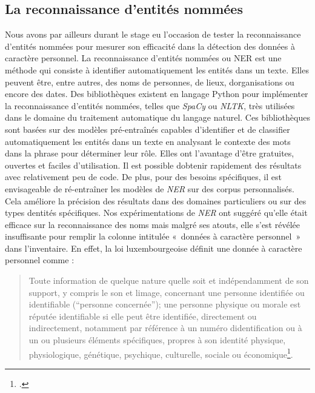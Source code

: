 \subsection{La reconnaissance d'entités nommées}

	Nous avons par ailleurs durant le stage eu l'occasion de tester la
reconnaissance d'entités nommées pour mesurer son efficacité dans la
détection des données à caractère personnel. La reconnaissance d'entités
nommées ou \gls{NER} est une méthode qui
consiste à identifier automatiquement les entités dans un texte. Elles
peuvent être, entre autres, des noms de personnes, de lieux,
d\textquotesingle organisations ou encore des dates. Des bibliothèques
existent en langage Python pour implémenter la reconnaissance d'entités
nommées, telles que \emph{SpaCy} ou \emph{NLTK}, très utilisées dans le
domaine du traitement automatique du langage naturel. Ces bibliothèques
sont basées sur des modèles pré-entraînés capables d'identifier et de
classifier automatiquement les entités dans un texte en analysant le
contexte des mots dans la phrase pour déterminer leur rôle. Elles ont l'avantage d'être gratuites, ouvertes et faciles
d'utilisation. Il est possible d\textquotesingle obtenir rapidement des
résultats avec relativement peu de code. De plus, pour des besoins
spécifiques, il est envisageable de ré-entraîner les modèles de \emph{NER} sur
des corpus personnalisés. Cela améliore la
précision des résultats dans des domaines particuliers ou sur des types
d\textquotesingle entités spécifiques.
Nos expérimentations de \emph{NER} ont suggéré qu'elle était efficace sur la reconnaissance des noms mais malgré ses atouts, elle s'est révélée
insuffisante pour remplir la colonne intitulée «~données à caractère
personnel~» dans l'inventaire. En effet, la loi luxembourgeoise définit
une donnée à caractère personnel comme :

\begin{quote}
	Toute information de quelque nature qu\textquotesingle elle soit et
	indépendamment de son support, y compris le son et
	l\textquotesingle image, concernant une personne identifiée ou
	identifiable (\enquote{personne concernée}); une personne physique ou morale est
	réputée identifiable si elle peut être identifiée, directement ou
	indirectement, notamment par référence à un numéro
	d\textquotesingle identification ou à un ou plusieurs éléments
	spécifiques, propres à son identité physique, physiologique, génétique,
	psychique, culturelle, sociale ou économique\footcite{loi_2002}.
\end{quote}

